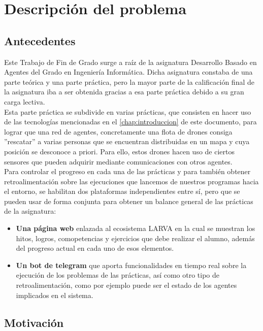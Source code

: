 \chapter{Descripción del problema}

\section{Antecedentes}

Este Trabajo de Fin de Grado surge a raíz de la asignatura Desarrollo Basado en Agentes del Grado en Ingeniería Informática. Dicha asignatura constaba de una parte teórica y una parte práctica, pero la mayor parte de la calificación final de la asignatura iba a ser obtenida gracias a esa parte práctica debido a su gran carga lectiva.\\

Esta parte práctica se subdivide en varias prácticas, que consisten en hacer uso de las tecnologías mencionadas en el \autoref{chap:introduccion} de este documento, para lograr que una red de agentes, concretamente una flota de drones consiga ''rescatar'' a varias personas que se encuentran distribuidas en un mapa y cuya posición se desconoce a priori. Para ello, estos drones hacen uso de ciertos sensores que pueden adquirir mediante comunicaciones con otros agentes.\\

Para controlar el progreso en cada una de las prácticas y para también obtener retroalimentación sobre las ejecuciones que lancemos de nuestros programas hacia el entorno, se habilitan dos plataformas independientes entre sí, pero que se pueden usar de forma conjunta para obtener un balance general de las prácticas de la asignatura:

\begin{itemize}
	\item \textbf{Una página web} enlazada al ecosistema LARVA en la cual se muestran los hitos, logros, comopetencias y ejercicios que debe realizar el alumno, además del progreso actual en cada uno de esos elementos.
	\item \textbf{Un bot de telegram} que aporta funcionalidades en tiempo real sobre la ejecución de los problemas de las prácticas, así como otro tipo de retroalimentación, como por ejemplo puede ser el estado de los agentes implicados en el sistema.
\end{itemize}

\section{Motivación}

